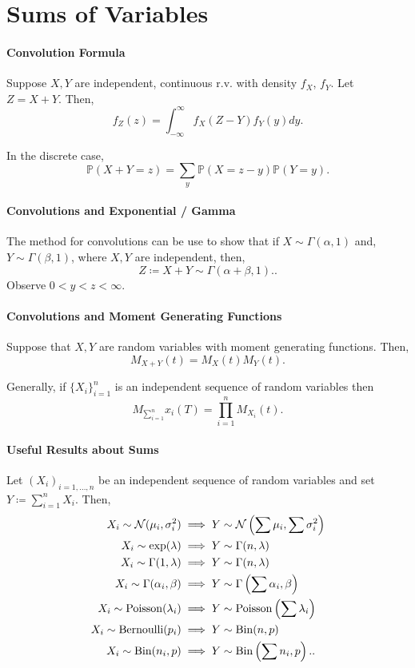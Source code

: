 \section{Sums of Variables}

\paragraph{Convolution Formula}
Suppose \( X, Y \) are independent, continuous r.v. with density  \( f_X \),
\( f_Y \). Let \( Z = X + Y \). Then,  \[
    f_Z(z) = \int_{-\infty}^{\infty} f_X(Z - Y) f_Y(y) dy
.\]

In the discrete case, \[
    \mathbb{P}(X + Y = z) = \sum_{y} \mathbb{P}(X = z - y) \mathbb{P}(Y = y)
.\]

\paragraph{Convolutions and Exponential / Gamma}
The method for convolutions can be use to show that if
\( X \sim \Gamma(\alpha , 1) \) and, \( Y \sim \Gamma(\beta, 1) \),
where \( X, Y \) are independent, then, \[
    Z \coloneqq X + Y \sim \Gamma(\alpha  + \beta, 1).
.\]
Observe \( 0 < y < z < \infty \).

\paragraph{Convolutions and Moment Generating Functions}
Suppose that \( X, Y \) are random variables with moment
generating functions. Then, \[
    M_{X + Y}(t) = M_X(t) M_Y(t)
.\]

Generally, if \( \{X_i\}_{i=1}^n  \) is an independent sequence of random variables
then  \[
    M_{\sum_{i=1}^n} x_i (T) = \prod_{i=1}^n M_{X_i} (t)
.\]

\paragraph{Useful Results about Sums}
Let \( (X_i)_{i = 1, \ldots, n} \) be an independent sequence of random
variables and set \( Y \coloneqq \sum_{i=1}^{n} X_i \).
Then,
\begin{align*}
    X_i \sim \mathcal{N}(\mu_i, \sigma_i^2)
        &\implies Y \sim \mathcal{N} \left( \sum \mu_i, \sum \sigma_i^2 \right) \\
    X_i \sim \exp(\lambda)
        &\implies Y \sim \Gamma(n, \lambda) \\
    X_i \sim \Gamma(1, \lambda)
        &\implies Y \sim \Gamma(n, \lambda) \\
    X_i \sim \Gamma(\alpha_i, \beta)
        &\implies Y \sim \Gamma\left(\sum \alpha_i, \beta \right) \\
    X_i \sim \mathrm{Poisson}(\lambda_i)
        &\implies Y \sim \mathrm{Poisson}\left(\sum \lambda_i\right) \\
    X_i \sim \mathrm{Bernoulli}(p_i)
        &\implies Y \sim \mathrm{Bin}(n, p) \\
    X_i \sim \mathrm{Bin}(n_i, p)
        &\implies Y \sim \mathrm{Bin}\left(\sum n_i, p\right).
.\end{align*}

